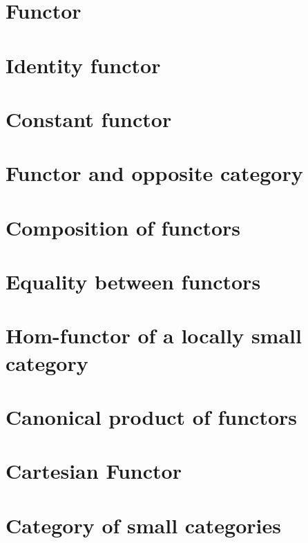 \section{Functor}
    
\section{Identity functor}
    
\section{Constant functor}
    
\section{Functor and opposite category}
    
\section{Composition of functors}
    
\section{Equality between functors}
    
\section{Hom-functor of a locally small category}
    
\section{Canonical product of functors}
    
\section{Cartesian Functor}
    
\section{Category of small categories}
    
